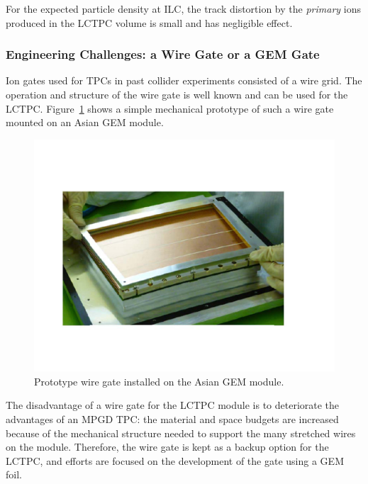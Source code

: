 For the expected particle density at ILC, the track distortion by the
{\em{primary}} ions produced in the LCTPC volume is small and has negligible effect.



\subsubsection{Engineering Challenges: a Wire Gate or a GEM Gate}

Ion gates used for TPCs in past collider experiments consisted of a wire grid. The operation and
structure of the wire gate is well known and can be used for the LCTPC. Figure~\ref{Fig2gating} shows
a simple mechanical prototype of such a wire gate mounted on an Asian GEM module.


\begin{figure}[htb!]
\begin{center}
\includegraphics[width=\columnwidth]{Tracker/TPC_Bonn/plots/TPC-Gate_Fig2gating.pdf}%
\caption{\label{Fig2gating} {Prototype wire gate installed on the Asian GEM module.}}
\end{center}
\end{figure}

The disadvantage of a wire gate for the LCTPC module is to deteriorate the advantages of an MPGD TPC:
the material and space budgets are increased because of the mechanical structure needed to support the many
stretched wires on the module. Therefore, the wire gate is kept as a backup option for the LCTPC, and efforts
are focused on the development of the gate using a GEM foil.

